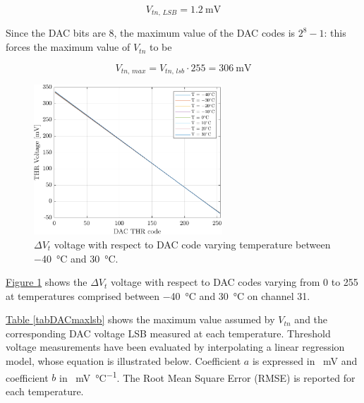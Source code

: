\begin{equation}
    V_{\textit{tn, LSB}} = \SI{1.2}{\milli\volt}
\end{equation}

\noindent
Since the DAC bits are 8, the maximum value of the DAC codes is $2^{8}-1$: this forces the maximum value of $V_{\textit{tn}}$ to be

\begin{equation}
    V_{\textit{tn, max}} = V_{\textit{tn, lsb}} \cdot 255 = \SI{306}{\milli\volt}
\end{equation}

\begin{figure}[ht]
    \centering 
    \includegraphics[width=0.63\textwidth]{Images/chap1/results/DAC_thr/DAC_thr_voltage_TEMP.pdf}
    \caption{$\Delta V_{\textit{t}}$ voltage with respect to DAC code varying temperature between \SI{-40}{\celsius} and \SI{30}{\celsius}.}
    \label{figDACthrtemp}
\end{figure}

\noindent
\hyperref[figDACthrtemp]{Figure \ref{figDACthrtemp}} shows the $\Delta V_{\textit{t}}$ voltage with respect to DAC codes varying from 0 to 255 at temperatures comprised between \SI{-40}{\celsius} and \SI{30}{\celsius} on channel 31. 

\hyperref[tabDACmaxlsb]{Table \ref{tabDACmaxlsb}} shows the maximum value assumed by $V_{\textit{tn}}$ and the corresponding DAC voltage LSB measured at each temperature. Threshold voltage measurements have been evaluated by interpolating a linear regression model, whose equation is illustrated below. Coefficient $a$ is expressed in \SI{}{\milli\volt} and coefficient $b$ in \SI{}{\milli\volt\per\celsius}. The Root Mean Square Error (RMSE) is reported for each temperature.

